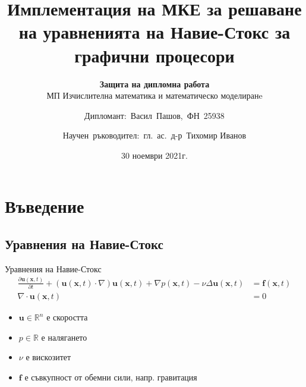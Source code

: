 \documentclass{beamer}
\title[]{Имплементация на МКЕ за решаване на уравненията на Навие-Стокс за графични процесори}
\subtitle{\textbf{Защита на дипломна работа}\\
\small{МП \glqq Изчислителна математика и математическо моделиранe\grqq}}
\author[]{Дипломант:~Васил~Пашов,~ФН~25938\\ \and
Научен~ръководител:~гл.~ас.~д-р~Тихомир Иванов}
\date{30 ноември 2021г.}
\newcommand{\vecf}[1]{\textbf{#1}}
\begin{document}
\begin{frame}
    \titlepage
\end{frame}

\section{Въведение}
\subsection{Уравнения на Навие-Стокс}
\begin{frame}{Уравнения на Навие-Стокс}
\begin{align*}
  \frac{\partial \vecf{u}(\vecf{x}, t)}{\partial t} + (\vecf{u}(\vecf{x}, t)\cdot\nabla)\vecf{u}(\vecf{x}, t) + \nabla p(\vecf{x}, t) - \nu\Delta\vecf{u}(\vecf{x}, t) &= \vecf{f}(\vecf{x}, t)\\
  \nabla \cdot \vecf{u}(\vecf{x}, t) &= 0
\end{align*}
\begin{itemize}
  \item $\vecf{u} \in \mathbb{R}^n$ е скоростта
  \item $p \in \mathbb{R}$ е налягането
  \item $\nu$ е вискозитет
  \item $\vecf{f}$ е съвкупност от обемни сили, напр. гравитация
\end{itemize}
\end{frame}
\end{document}
